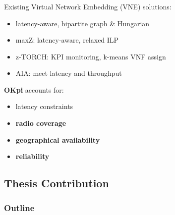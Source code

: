 \documentclass[aspectratio=169]{beamer}
\begin{document}
\begin{frame}
    \frametitle{\secname}
    \framesubtitle{\subsecname}

    Existing Virtual Network Embedding (VNE) solutions:
    \begin{itemize}
        \item latency-aware, bipartite graph \& Hungarian \cite{getting-the-most}
        \item maxZ: latency-aware, relaxed ILP~\cite{maxZ}
        \item z-TORCH: KPI monitoring, k-means VNF assign~\cite{z-TORCH}
        \item AIA: meet latency and throughput~\cite{adaptive-interference}
    \end{itemize}\pause
    \textbf{\color{red}OKpi} accounts for:
    \begin{itemize}
        \item latency constraints
        \item \textbf{\color{red}radio coverage}
        \item \textbf{\color{red}geographical availability}
        \item \textbf{\color{red}reliability}
    \end{itemize}
\end{frame}



\subsection{Thesis Contribution}
\begin{frame}
    \frametitle{Outline}
    \tableofcontents[subsectionstyle=show/shaded/hide,sectionstyle=show/shaded]
\end{frame}
\end{document}
